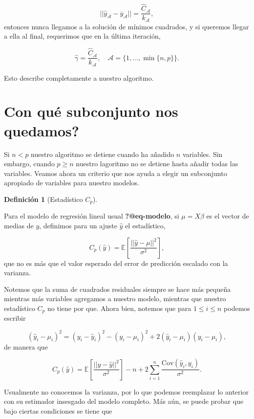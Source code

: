 \documentclass[
  letterpaper,
  DIV=11,
  numbers=noendperiod]{scrreprt}
\theoremstyle{definition}
\newtheorem{definition}{Definición}[section]
\theoremstyle{plain}
\theoremstyle{remark}
\begin{document}
\[
||\hat y_\mathcal A-\overline y_\mathcal A||=\frac{\hat C_\mathcal A}{k_\mathcal A},
\]entonces nunca llegamos a la solución de mínimos cuadrados, y si
queremos llegar a ella al final, requerimos que en la última iteración,

\[
\hat\gamma=\frac{\hat C_\mathcal A}{k_\mathcal A},\quad \mathcal A=\{1,\dots, \min\{n,p\}\}.
\]

Esto describe completamente a nuestro algoritmo.

\section{Con qué subconjunto nos
quedamos?}\label{con-quuxe9-subconjunto-nos-quedamos}

Si \(n<p\) nuestro algoritmo se detiene cuando ha añadido \(n\)
variables. Sin embargo, cuando \(p\geq n\) nuestro lagoritmo no se
detiene hasta añadir todas las variables. Veamos ahora un criterio que
nos ayuda a elegir un subconjunto apropiado de variables para nuestro
modelos.

\begin{definition}[Estadístico
\(C_p\)]\protect\hypertarget{def-Cp}{}\label{def-Cp}

Para el modelo de regresión lineal usual \textbf{?@eq-modelo}, si
\(\mu=X\beta\) es el vector de medias de \(y\), definimos para un ajuste
\(\hat y\) el estadístico,

\[
C_p(\hat y)=\mathbb E\left[\frac{||\hat y-\mu||^2}{\sigma^2}\right],
\]que no es más que el valor esperado del error de predicción escalado
con la varianza.

\end{definition}

Notemos que la suma de cuadrados residuales siempre se hace más pequeña
mientras más variables agregamos a nuestro modelo, mientras que nuestro
estadístico \(C_p\) no tiene por que. Ahora bien, notemos que para
\(1\leq i\leq n\) podemos escribir

\[
(\hat y_i-\mu_i)^2=(y_i-\hat y_i)^2-(y_i-\mu_i)^2+2(\hat y_i-\mu_i)(y_i-\mu_i),
\] de manera que

\[
C_p(\hat y)=\mathbb E\left[\frac{||y-\hat y||^2}{\sigma^2}\right]-n+2\sum_{i=1}^n\frac{\text{Cov}(\hat y_i,y_i)}{\sigma^2}.
\]

Usualmente no conocemos la varianza, por lo que podemos reemplazar lo
anterior con su estimador insesgado del modelo completo. Más aún, se
puede probar que bajo ciertas condiciones se tiene que
\end{document}
